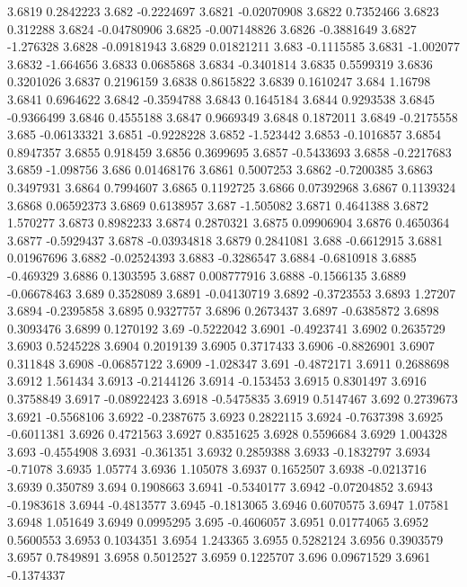 3.6819  0.2842223
3.682  -0.2224697
3.6821  -0.02070908
3.6822  0.7352466
3.6823  0.312288
3.6824  -0.04780906
3.6825  -0.007148826
3.6826  -0.3881649
3.6827  -1.276328
3.6828  -0.09181943
3.6829  0.01821211
3.683  -0.1115585
3.6831  -1.002077
3.6832  -1.664656
3.6833  0.0685868
3.6834  -0.3401814
3.6835  0.5599319
3.6836  0.3201026
3.6837  0.2196159
3.6838  0.8615822
3.6839  0.1610247
3.684  1.16798
3.6841  0.6964622
3.6842  -0.3594788
3.6843  0.1645184
3.6844  0.9293538
3.6845  -0.9366499
3.6846  0.4555188
3.6847  0.9669349
3.6848  0.1872011
3.6849  -0.2175558
3.685  -0.06133321
3.6851  -0.9228228
3.6852  -1.523442
3.6853  -0.1016857
3.6854  0.8947357
3.6855  0.918459
3.6856  0.3699695
3.6857  -0.5433693
3.6858  -0.2217683
3.6859  -1.098756
3.686  0.01468176
3.6861  0.5007253
3.6862  -0.7200385
3.6863  0.3497931
3.6864  0.7994607
3.6865  0.1192725
3.6866  0.07392968
3.6867  0.1139324
3.6868  0.06592373
3.6869  0.6138957
3.687  -1.505082
3.6871  0.4641388
3.6872  1.570277
3.6873  0.8982233
3.6874  0.2870321
3.6875  0.09906904
3.6876  0.4650364
3.6877  -0.5929437
3.6878  -0.03934818
3.6879  0.2841081
3.688  -0.6612915
3.6881  0.01967696
3.6882  -0.02524393
3.6883  -0.3286547
3.6884  -0.6810918
3.6885  -0.469329
3.6886  0.1303595
3.6887  0.008777916
3.6888  -0.1566135
3.6889  -0.06678463
3.689  0.3528089
3.6891  -0.04130719
3.6892  -0.3723553
3.6893  1.27207
3.6894  -0.2395858
3.6895  0.9327757
3.6896  0.2673437
3.6897  -0.6385872
3.6898  0.3093476
3.6899  0.1270192
3.69  -0.5222042
3.6901  -0.4923741
3.6902  0.2635729
3.6903  0.5245228
3.6904  0.2019139
3.6905  0.3717433
3.6906  -0.8826901
3.6907  0.311848
3.6908  -0.06857122
3.6909  -1.028347
3.691  -0.4872171
3.6911  0.2688698
3.6912  1.561434
3.6913  -0.2144126
3.6914  -0.153453
3.6915  0.8301497
3.6916  0.3758849
3.6917  -0.08922423
3.6918  -0.5475835
3.6919  0.5147467
3.692  0.2739673
3.6921  -0.5568106
3.6922  -0.2387675
3.6923  0.2822115
3.6924  -0.7637398
3.6925  -0.6011381
3.6926  0.4721563
3.6927  0.8351625
3.6928  0.5596684
3.6929  1.004328
3.693  -0.4554908
3.6931  -0.361351
3.6932  0.2859388
3.6933  -0.1832797
3.6934  -0.71078
3.6935  1.05774
3.6936  1.105078
3.6937  0.1652507
3.6938  -0.0213716
3.6939  0.350789
3.694  0.1908663
3.6941  -0.5340177
3.6942  -0.07204852
3.6943  -0.1983618
3.6944  -0.4813577
3.6945  -0.1813065
3.6946  0.6070575
3.6947  1.07581
3.6948  1.051649
3.6949  0.0995295
3.695  -0.4606057
3.6951  0.01774065
3.6952  0.5600553
3.6953  0.1034351
3.6954  1.243365
3.6955  0.5282124
3.6956  0.3903579
3.6957  0.7849891
3.6958  0.5012527
3.6959  0.1225707
3.696  0.09671529
3.6961  -0.1374337
